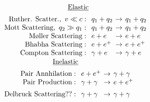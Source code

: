 \documentclass{article}
\begin{document}
\(\arraycolsep=2pt\begin{array}[t]{r l c l}
    \underline{\text{Elastic}}
        \\[5pt]
    {\text{Ruther. Scatter.},\ v \ll c} :\ & q_1 + q_2 & \rightarrow & q_1 + q_2 \\
    \text{Mott Scattering},\ q_2 \gg q_1 :\ & q_1 + q_2 & \rightarrow & q_1 + q_2 \\
    {\text{M\text{\o}ller Scattering}} :\ &  e + e & \rightarrow & e + e\\
    {\text{Bhabha Scattering}} :\ & e + e^+ & \rightarrow & e + e^+\\
    {\text{Compton Scattering}} :\ & \gamma + e & \rightarrow & \gamma + e\\
\end{array}\)
\hspace{20pt}
\(\arraycolsep=2pt\begin{array}[t]{r l c l}
    \underline{\text{Inelastic}}
        \\[5pt]
    {\text{Pair Annhilation}} :\ & e + e^+ & \rightarrow & \gamma + \gamma\\
    {\text{Pair Production}} :\ & \gamma + \gamma & \rightarrow & e + e^+ 
        \\[5pt]
    {\text{Delbruck Scattering??}} :\ & \gamma + \gamma & \rightarrow & \gamma + \gamma\\
\end{array}\)
\end{document}
